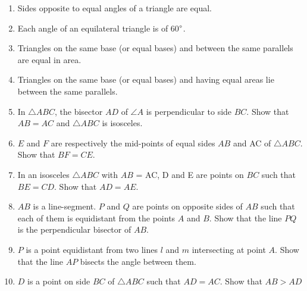 \renewcommand{\theequation}{\theenumi}
\begin{enumerate}[label=\arabic*.,ref=\thesubsection.\theenumi]
\item  Sides opposite to equal angles of a triangle are equal. 
%
\item  Each angle of an equilateral triangle is of 60$\degree$. 
%


\item Triangles on the same base (or equal bases) and between the same parallels are equal in area.
\item Triangles on the same base (or equal bases) and having equal areas lie between the same parallels.
\item In $\triangle ABC$, the bisector $AD$ of $\angle  A$ is perpendicular to side $BC$. Show that $AB = AC$ and $\triangle ABC$ is isosceles.
\item $E$ and $F$ are respectively the mid-points of equal sides $AB$ and AC of $\triangle ABC$. Show that $BF = CE$. 
\item In an isosceles $\triangle ABC$ with $AB$ = AC, D and E are points on $BC$ such that $BE = CD$. Show that $AD = AE$. 
%
\item $AB$ is a line-segment. $P$ and $Q$ are points on opposite sides of $AB$ such that each of them is equidistant from the points $A$ and $B$. Show that the line $PQ $ is the perpendicular bisector of $AB$.
%
\item $P$ is a point equidistant from two lines $l$ and $m$ intersecting at point $A$.  Show that the line  $AP$  bisects the angle between them.
%
\item $D$ is a point on side $BC$ of $\triangle  ABC$ such that $AD = AC$. Show that $AB > AD$


\end{enumerate}
